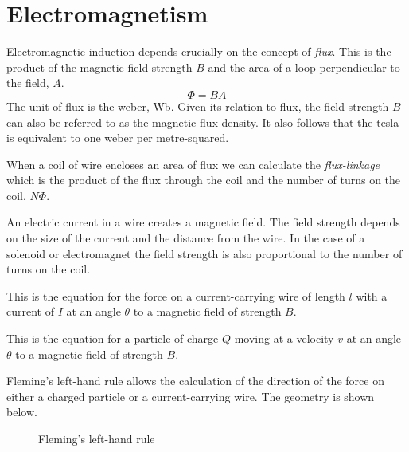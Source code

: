 \documentclass[main.tex]{subfiles}
\begin{document}
\chapter{Electromagnetism}

Electromagnetic induction depends crucially on the concept of \emph{flux}. This is the product of the magnetic field strength $B$ and the area of a loop perpendicular to the field, $A$.
\[ \Phi = BA \]
The unit of flux is the weber, Wb. Given its relation to flux, the field strength $B$ can also be referred to as the magnetic flux density. It also follows that the tesla is equivalent to one weber per metre-squared.

When a coil of wire encloses an area of flux we can calculate the \emph{flux-linkage} which is the product of the flux through the coil and the number of turns on the coil, $N\Phi$.


An electric current in a wire creates a magnetic field. The field strength depends on the size of the current and the distance from the wire. In the case of a solenoid or electromagnet the field strength is also proportional to the number of turns on the coil.


This is the equation for the force on a current-carrying wire of length $l$ with a current of $I$ at an angle $\theta$ to a magnetic field of strength $B$.


This is the equation for a particle of charge $Q$ moving at a velocity $v$ at an angle $\theta$ to a magnetic field of strength $B$.


Fleming's left-hand rule allows the calculation of the direction of the force on either a charged particle or a current-carrying wire. The geometry is shown below.

\begin{figure}[h]
  \begin{center}
  \end{center}
  \caption{Fleming's left-hand rule}
  \label{flemminglh}
\end{figure}
\end{document}
